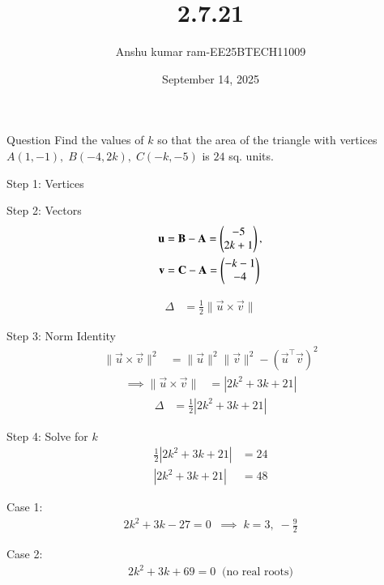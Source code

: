 \documentclass{beamer}
\title{2.7.21}
\date{September 14, 2025}
\author{Anshu kumar ram-EE25BTECH11009}
\begin{document}
\frame{\titlepage}

\begin{frame}{Question}
Find the values of $k$ so that the area of the triangle with vertices 
$A(1,-1),\; B(-4,2k),\; C(-k,-5)$ is $24$ sq. units.
\end{frame}

\begin{frame}{Step 1: Vertices}

\end{frame}

\begin{frame}{Step 2: Vectors}
\begin{align}
\mathbf{u} &= \mathbf{B}-\mathbf{A} = \begin{pmatrix}-5 \\ 2k+1\end{pmatrix}, \\
\mathbf{v} &= \mathbf{C}-\mathbf{A} = \begin{pmatrix}-k-1 \\ -4\end{pmatrix}
\end{align}

\begin{align}
\Delta &= \frac{1}{2}\|\vec{u}\times \vec{v}\|
\end{align}
\end{frame}

\begin{frame}{Step 3: Norm Identity}
\begin{align}
\|\vec{u}\times\vec{v}\|^2 
&= \|\vec{u}\|^2 \|\vec{v}\|^2 - (\vec{u}^\top\vec{v})^2
\end{align}
\begin{align}
\implies \|\vec{u}\times\vec{v}\| &= |2k^2+3k+21|
\end{align}
\begin{align}
\Delta &= \frac{1}{2}|2k^2+3k+21|
\end{align}
\end{frame}

\begin{frame}{Step 4: Solve for $k$}
\begin{align}
\frac{1}{2}|2k^2+3k+21| &= 24 \\
|2k^2+3k+21| &= 48
\end{align}

Case 1:
\begin{align}
2k^2+3k-27=0 \;\;\implies\; k=3,\; -\tfrac{9}{2}
\end{align}

Case 2:
\begin{align}
2k^2+3k+69=0 \;\; \text{(no real roots)}
\end{align}
\end{frame}
\end{document}
